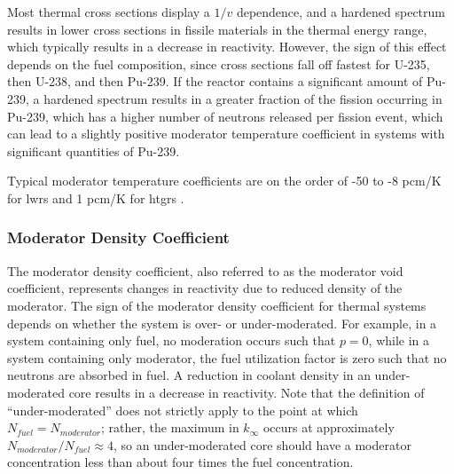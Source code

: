 Most thermal cross sections display a \(1/v\) dependence, and a hardened spectrum results in lower cross sections in fissile materials in the thermal energy range, which typically results in a decrease in reactivity. However, the sign of this effect depends on the fuel composition, since cross sections fall off fastest for U-235, then U-238, and then Pu-239. If the reactor contains a significant amount of Pu-239, a hardened spectrum results in a greater fraction of the fission occurring in Pu-239, which has a higher number of neutrons released per fission event, which can lead to a slightly positive moderator temperature coefficient in systems with significant quantities of Pu-239. 





Typical moderator temperature coefficients are on the order of -50 to -8 pcm/K for \glspl{lwr} and 1 pcm/K for \glspl{htgr} \cite{duderstadt}. 

\subsubsection{Moderator Density Coefficient}
The moderator density coefficient, also referred to as the moderator void coefficient, represents changes in reactivity due to reduced density of the moderator. The sign of the moderator density coefficient for thermal systems depends on whether the system is over- or under-moderated. For example, in a system containing only fuel, no moderation occurs such that \(p=0\), while in a system containing only moderator, the fuel utilization factor is zero such that no neutrons are absorbed in fuel. A reduction in coolant density in an under-moderated core results in a decrease in reactivity. Note that the definition of ``under-moderated'' does not strictly apply to the point at which \(N_{fuel}=N_{moderator}\); rather, the maximum in \(k_\infty\) occurs at approximately \(N_{moderator}/N_{fuel}\approx4\), so an under-moderated core should have a moderator concentration less than about four times the fuel concentration. 

